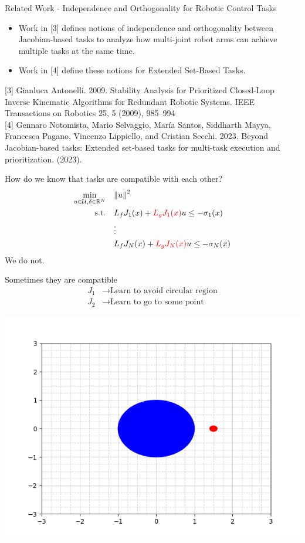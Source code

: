 \begin{frame}{Related Work - Independence and Orthogonality for Robotic Control Tasks}
	\begin{itemize}
		\item{Work in [3] defines notions of independence and orthogonality between Jacobian-based tasks to analyze how multi-joint robot arms can achieve multiple tasks at the same time.}
		\item{Work in [4] define these notions for Extended Set-Based Tasks.}
	\end{itemize}

	\seprule
	\footnotesize{[3] Gianluca Antonelli. 2009. Stability Analysis for Prioritized Closed-Loop Inverse Kinematic Algorithms for Redundant Robotic Systems. IEEE Transactions on Robotics 25, 5 (2009), 985–994}\\
	\footnotesize{[4] Gennaro Notomista, Mario Selvaggio, María Santos, Siddharth Mayya, Francesca Pagano, Vincenzo Lippiello, and Cristian Secchi. 2023. Beyond Jacobian-based tasks: Extended set-based tasks for multi-task execution and prioritization. (2023).}

\end{frame}

\begin{frame}{How do we know that tasks are compatible with each other?}
	\begin{align*}
		\min_{u \in \mathcal{U}, \delta \in \mathbb{R}^N} \quad & { \lVert u \rVert }^2 \\
		\textrm{s.t.} \quad & L_f {J}_1 (x) + { \color{red} L_g {J}_1 (x) } u \le - \sigma_1(x) \\
                \quad & \vdots \\
		\quad & L_f {J}_N (x) + { \color{red} L_g {J}_N (x) } u \le - \sigma_N(x) \\
	\end{align*}
	\centering
	We do not.
\end{frame}

\begin{frame}{Sometimes they are compatible}
	\begin{align*}
		{J}_1 &\rightarrow \textrm{Learn to avoid circular region} \\
		{J}_2 &\rightarrow \textrm{Learn to go to some point}
	\end{align*}
	\begin{minipage}{\textwidth}
		\centering		
		\includegraphics[width=0.5\linewidth]{a1g1}
	\end{minipage}%
\end{frame}

